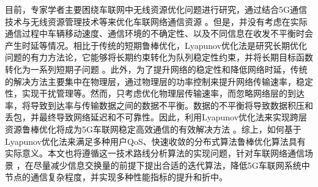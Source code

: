 目前，专家学者主要困绕车联网中无线资源优化问题进行研究，通过结合5G通信技术与无线资源管理技术等来优化车联网络通信资源 \cite{RAI}。但是，并没有考虑在实际通信过程中车辆移动速度、通信环境的不确定性、以及不同信息在收发不平衡时会产生时延等情况。相比于传统的短期鲁棒优化，Lyapunov优化法是研究长期优化问题的有力方法论，它能够将长期约束转化为队列稳定性约束，并将长期目标函数转化为一系列短期子问题 \cite{ACAR}。此外，为了提升网络的稳定性和降低网络时延，传统的解决方法主要集中在物理层，通过物理层的功率控制来提升网络传输速率，稳定性，实现干扰管理等。然而，只考虑优化物理层传输速率，而忽略网络层的到达率，将导致到达率与传输数据之间的数据不平衡。数据的不平衡将导致数据积压和丢包，并最终导致网络延迟和不可靠性。因此，利用Lyapunov优化法来实现跨层资源鲁棒优化将成为5G车联网稳定高效通信的有效解决方法 \cite{Gao2020}。综上，如何基于Lyapunov优化法来满足多种用户QoS、快速收敛的分布式算法鲁棒优化算法具有实际意义。本文也将遵循这一技术路线分析算法的实现问题，针对车联网络通信场景 \cite{Song2022}，在尽量减少信息交换量的前提下提出合适的迭代算法，降低5G车联网系统中节点的通信复杂程度，并实现多种性能指标的提升和折中。



